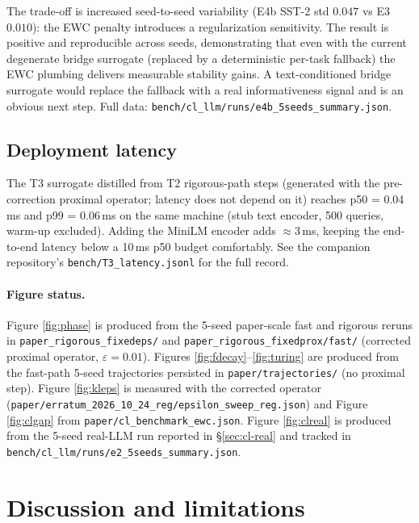 \documentclass[11pt]{article}
\begin{document}
The trade-off is increased seed-to-seed variability (E4b SST-2 std
$0.047$ vs E3 $0.010$): the EWC penalty introduces a regularization
sensitivity. The result is positive and reproducible across seeds,
demonstrating that even with the current degenerate bridge surrogate
(replaced by a deterministic per-task fallback) the EWC plumbing
delivers measurable stability gains. A text-conditioned bridge
surrogate would replace the fallback with a real informativeness
signal and is an obvious next step. Full data:
\texttt{bench/cl\_llm/runs/e4b\_5seeds\_summary.json}.

\subsection{Deployment latency}
The T3 surrogate distilled from T2 rigorous-path steps (generated with
the pre-correction proximal operator; latency does not depend on it) reaches
p50 = 0.04\,ms and p99 = 0.06\,ms on the same machine (stub text
encoder, 500 queries, warm-up excluded). Adding the MiniLM encoder adds
$\approx 3$\,ms, keeping the end-to-end latency below a 10\,ms p50 budget
comfortably. See the companion repository's \texttt{bench/T3\_latency.jsonl}
for the full record.

\paragraph{Figure status.}
Figure \ref{fig:phase} is produced from the 5-seed paper-scale fast and
rigorous reruns in \texttt{paper\_rigorous\_fixedeps/} and
\texttt{paper\_rigorous\_fixedprox/fast/} (corrected proximal operator,
$\varepsilon = 0.01$). Figures \ref{fig:fdecay}--\ref{fig:turing} are
produced from the fast-path 5-seed trajectories persisted in
\texttt{paper/trajectories/} (no proximal step). Figure \ref{fig:kleps}
is measured with the corrected operator
(\texttt{paper/erratum\_2026\_10\_24\_reg/epsilon\_sweep\_reg.json}) and
Figure \ref{fig:clgap} from \texttt{paper/cl\_benchmark\_ewc.json}.
Figure \ref{fig:clreal} is produced from the 5-seed real-LLM run
reported in §\ref{sec:cl-real} and tracked in
\texttt{bench/cl\_llm/runs/e2\_5seeds\_summary.json}.


\section{Discussion and limitations}
\label{sec:disc}
\end{document}
